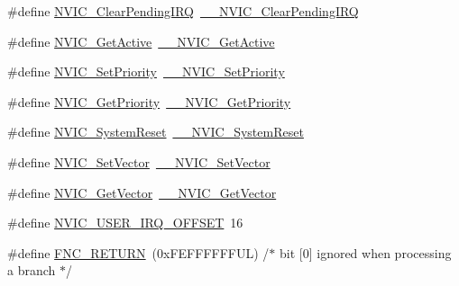 \begin{DoxyCompactItemize}
\item 
\#define \hyperlink{group___c_m_s_i_s___core___n_v_i_c_functions_ga590cf113000a079b1f0ea3dcd5b5316c}{N\+V\+I\+C\+\_\+\+Clear\+Pending\+I\+RQ}~\hyperlink{group___c_m_s_i_s___core___n_v_i_c_functions_ga562a86dbdf14827d0fee8fdafb04d191}{\+\_\+\+\_\+\+N\+V\+I\+C\+\_\+\+Clear\+Pending\+I\+RQ}
\item 
\#define \hyperlink{group___c_m_s_i_s___core___n_v_i_c_functions_ga58ad3f352f832235ab3b192ff4745320}{N\+V\+I\+C\+\_\+\+Get\+Active}~\hyperlink{group___c_m_s_i_s___core___n_v_i_c_functions_gaa2837003c28c45abf193fe5e8d27f593}{\+\_\+\+\_\+\+N\+V\+I\+C\+\_\+\+Get\+Active}
\item 
\#define \hyperlink{group___c_m_s_i_s___core___n_v_i_c_functions_gae0e9d0e2f7b6133828c71b57d4941c35}{N\+V\+I\+C\+\_\+\+Set\+Priority}~\hyperlink{group___c_m_s_i_s___core___n_v_i_c_functions_ga505338e23563a9c074910fb14e7d45fd}{\+\_\+\+\_\+\+N\+V\+I\+C\+\_\+\+Set\+Priority}
\item 
\#define \hyperlink{group___c_m_s_i_s___core___n_v_i_c_functions_gaf59b9d0a791d2157abb319753953eceb}{N\+V\+I\+C\+\_\+\+Get\+Priority}~\hyperlink{group___c_m_s_i_s___core___n_v_i_c_functions_gaeb9dc99c8e7700668813144261b0bc73}{\+\_\+\+\_\+\+N\+V\+I\+C\+\_\+\+Get\+Priority}
\item 
\#define \hyperlink{group___c_m_s_i_s___core___n_v_i_c_functions_ga6aa0367d3642575610476bf0366f0c48}{N\+V\+I\+C\+\_\+\+System\+Reset}~\hyperlink{group___c_m_s_i_s___core___n_v_i_c_functions_ga0d9aa2d30fa54b41eb780c16e35b676c}{\+\_\+\+\_\+\+N\+V\+I\+C\+\_\+\+System\+Reset}
\item 
\#define \hyperlink{group___c_m_s_i_s___core___n_v_i_c_functions_ga804af63bb4c4c317387897431814775d}{N\+V\+I\+C\+\_\+\+Set\+Vector}~\hyperlink{group___c_m_s_i_s___core___n_v_i_c_functions_ga0df355460bc1783d58f9d72ee4884208}{\+\_\+\+\_\+\+N\+V\+I\+C\+\_\+\+Set\+Vector}
\item 
\#define \hyperlink{group___c_m_s_i_s___core___n_v_i_c_functions_ga955eb1c33a3dcc62af11a8385e8c0fc8}{N\+V\+I\+C\+\_\+\+Get\+Vector}~\hyperlink{group___c_m_s_i_s___core___n_v_i_c_functions_ga44b665d2afb708121d9b10c76ff00ee5}{\+\_\+\+\_\+\+N\+V\+I\+C\+\_\+\+Get\+Vector}
\item 
\#define \hyperlink{group___c_m_s_i_s___core___n_v_i_c_functions_ga8045d905a5ca57437d8e6f71ffcb6df5}{N\+V\+I\+C\+\_\+\+U\+S\+E\+R\+\_\+\+I\+R\+Q\+\_\+\+O\+F\+F\+S\+ET}~16
\item 
\#define \hyperlink{group___c_m_s_i_s___core___n_v_i_c_functions_gabaa62910bf89acc186ae998c611e64ab}{F\+N\+C\+\_\+\+R\+E\+T\+U\+RN}~(0x\+F\+E\+F\+F\+F\+F\+F\+F\+U\+L)     /$\ast$ bit \mbox{[}0\mbox{]} ignored when processing a branch                             $\ast$/

\end{DoxyCompactItemize}
